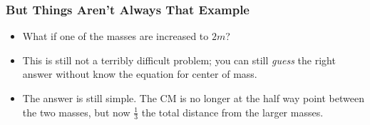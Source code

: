 \documentclass[12pt,compress,aspectratio=169]{beamer}
\begin{document}
 
\begin{frame}
  \frametitle{But Things Aren't Always That Example}
  \begin{itemize}
  \item What if one of the masses are increased to $2m$?
  \item This is still not a terribly difficult problem; you can still
    \emph{guess} the right answer without know the equation for center of mass.
    
    \vspace{0.25in}
    \begin{center}
    \end{center}
    \vspace{0.15in}

  \item<2-> The answer is still simple. The CM is no longer at the half way
    point between the two masses, but now $\frac{1}{3}$ the total distance from
    the larger masses.
  \end{itemize}
\end{frame}
\end{document}
